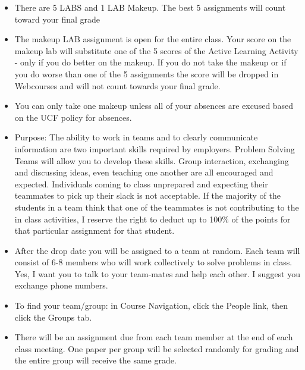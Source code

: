 \documentclass[11pt]{paper}
\begin{document}
\begin{itemize}
\item There are 5 LABS and 1 LAB Makeup. The best 5 assignments will count toward your final grade
\item The makeup LAB assignment is open for the entire class. Your score on the makeup lab will substitute one of the 5 scores of the Active Learning Activity - only if you do better on the makeup. If you do not take the makeup or if you do worse than one of the 5 assignments the score will be dropped in Webcourses and will not count towards your final grade.
\item You can only take one makeup unless all of your absences are excused based on the UCF policy for absences.
\item Purpose: The ability to work in teams and to clearly communicate information are two important skills required by employers. Problem Solving Teams will allow you to develop these skills. Group interaction, exchanging and discussing ideas, even teaching one another are all encouraged and expected. Individuals coming to class unprepared and expecting their teammates to pick up their slack is not acceptable. If the majority of the students in a team think that one of the teammates is not contributing to the in class activities, I reserve the right to deduct up to 100\% of the points for that particular assignment for that student.
\item After the drop date you will be assigned to a team at random. Each team will consist of 6-8 members who will work collectively to solve problems in class. Yes, I want you to talk to your team-mates and help each other. I suggest you exchange phone numbers.
\item To find your team/group: in Course Navigation, click the People link, then click the Groups tab.
\item There will be an assignment due from each team member at the end of each class meeting. One paper per group will be selected randomly for grading and the entire group will receive the same grade.


\end{itemize}
\end{document}
